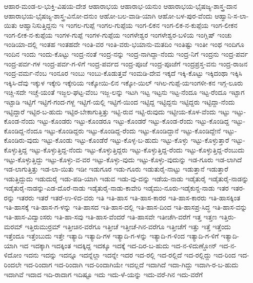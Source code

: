 ಆಹಾರ-ಮಂಡ-ಲ-ಭುಕ್ತಿ-ವಿಷಯ-ದೇಶ
ಆಹಾರಾಭಯ
ಆಹಾರಾಭ-ಯನುಂ
ಆಹಾರಾಭಯ-ಭೈಷಜ್ಯ-ಶಾಸ್ತ್ರ-ದಾನ
ಆಹಾರಾಭಯ-ಭೈಷಜ್ಯ-ಶಾಸ್ತ್ರ-ವಿನೋ-ದನುಂ
ಆಹೋ-ಬಲ-ವಾಡಿ-ಯಾಗಿ
ಆಹೋ-ಬಳ-ಪುರ-ವೆಂದು
ಆಹ್ವಾನಿ-ಸ-ಲಾ-ಯಿತು
ಆಹ್ವಾನಿಸುತ್ತಿದ್ದನು
ಇ
ಇಂಗಲ-ಗುಪ್ಪೆ
ಇಂಗಲ-ಗುಪ್ಪೆಯ
ಇಂಗ-ಲಿಕನ
ಇಂಗ-ಲಿಕ-ನ-ಕುಪ್ಪೆಯ
ಇಂಗ-ಲೀಕನ
ಇಂಗ-ಲೀಕ-ನ-ಕುಪ್ಪೆಯ
ಇಂಗಳ-ಗುಪ್ಪೆ
ಇಂಗಳ-ಗುಪ್ಪೆಯ
ಇಂಗಳೇಶ್ವರ
ಇಂಗಳೇಶ್ವರ-ಬಳಿಯ
ಇಂಗ್ಲಿಷ್
ಇಂಚು
ಇಂಡಿಯಾ-ದಲ್ಲಿ
ಇಂತಹ
ಇಂತಹದೇ
ಇಂತಿ-ವರ
ಇಂತಿ-ವರು-ಭಯಾನು-ಮತದಿಂ
ಇಂತಿಷ್ಟು
ಇಂತೀ
ಇಂಥ
ಇಂದಿಗೂ
ಇಂದಿನ
ಇಂದು
ಇಂದು-ಕೊಟ್ಟು
ಇಂದ್ರ-ನಂತೆ
ಇಂದ್ರ-ನನ್ನು
ಇಂದ್ರ-ನಾಗಿದ್ದಾ-ನೆಂದು
ಇಂದ್ರ-ನಿಗೆ
ಇಂದ್ರನು
ಇಂದ್ರ-ಪರ್ವ
ಇಂದ್ರ-ಪರ್ವ-ಗಳ
ಇಂದ್ರ-ಪರ್ವ-ಗ-ಳಿಗೆ
ಇಂದ್ರ-ಪರ್ವದ
ಇಂದ್ರ-ಪೂಜೆ
ಇಂದ್ರ-ಪೂಜೆಗೆ
ಇಂದ್ರಪ್ರಸ್ತ-ವನು
ಇಂದ್ರ-ರಾಜನ
ಇಂದ್ರ-ವರ್ಮ-ನೆಂಬ
ಇಂನೂರ
ಇಂಬು
ಇಂಬು-ಕೊಡುತ್ತವೆ
ಇಂಮಡಿ-ದೇವ
ಇಕ್ಕದೆ
ಇಕ್ಕಿ-ಕೊಟ್ಟು
ಇಕ್ಕಿದಂಥಾ
ಇಕ್ಕಿಸಿ
ಇಕ್ಕಿಸಿ-ದೆವು
ಇಕ್ಕುಳ
ಇಕ್ಕೇರಿ
ಇಕ್ಕೇರಿಯ
ಇಕ್ಕೋಯಿ-ಲಿನ
ಇಕ್ಕೋ-ಯಿಲ್
ಇಗಿಲ-ಗುಪ್ಪೆ-ಯಇಂಗಳೀ-ಕನ
ಇಗ್ಗ-ಲೂರು
ಇಚ್ಚಿ-ಸದೇ
ಇಚ್ಚೆ-ಯಂತೆ
ಇಜ್ಜಲ-ಘಟ್ಟ-ವೆಂಬ
ಇಜ್ಜ-ಲನ್ನು
ಇಟಗಿ
ಇಟ್ಟ
ಇಟ್ಟನು
ಇಟ್ಟ-ನೆಂದೂ
ಇಟ್ಟ-ರೆಂದೂ
ಇಟ್ಟಾಗ
ಇಟ್ಟಾಡಿ
ಇಟ್ಟಿಗೆ
ಇಟ್ಟಿಗೆ-ಗಂದ-ಗಳ್ದ
ಇಟ್ಟಿಗೆ-ಯಲ್ಲಿ
ಇಟ್ಟಿಗೆ-ಯಿಂದ
ಇಟ್ಟಿದ್ದ
ಇಟ್ಟಿದ್ದನು
ಇಟ್ಟಿದ್ದರು
ಇಟ್ಟಿದ್ದಾ-ನೆಂದು
ಇಟ್ಟಿದ್ದಾರೆ
ಇಟ್ಟಿರ-ಬ-ಹುದು
ಇಟ್ಟಿರ-ಬೇಕಾಗುತ್ತಿತ್ತು
ಇಟ್ಟಿ-ರುವ
ಇಟ್ಟಿ-ರುವುದು
ಇಟ್ಟೀಯ-ಕೊಳ-ವೆಂದು
ಇಟ್ಟು
ಇಟ್ಟು-ಕೊಂಡ-ನೆಂದು
ಇಟ್ಟು-ಕೊಂಡರು
ಇಟ್ಟು-ಕೊಂಡರೂ
ಇಟ್ಟು-ಕೊಂಡರೆ
ಇಟ್ಟು-ಕೊಂಡ-ರೆಂದು
ಇಟ್ಟು-ಕೊಂಡಿದ್ದ
ಇಟ್ಟು-ಕೊಂಡಿದ್ದ-ನೆಂದೂ
ಇಟ್ಟು-ಕೊಂಡಿದ್ದರು
ಇಟ್ಟು-ಕೊಂಡಿದ್ದ-ರೆಂದು
ಇಟ್ಟು-ಕೊಂಡಿದ್ದಾನೆ
ಇಟ್ಟು-ಕೊಂಡಿದ್ದೇನೆ
ಇಟ್ಟು-ಕೊಂಡಿರು-ವುದು
ಇಟ್ಟು-ಕೊಂಡು
ಇಟ್ಟು-ಕೊಂಡೆರೆ
ಇಟ್ಟು-ಕೊಳ್ಳ-ಬ-ಹುದು
ಇಟ್ಟು-ಕೊಳ್ಳು
ಇಟ್ಟು-ಕೊಳ್ಳುತ್ತಾರೆ
ಇಟ್ಟು-ಕೊಳ್ಳುತ್ತಿದ್ದ
ಇಟ್ಟು-ಕೊಳ್ಳುತ್ತಿದ್ದ-ನೆಂದು
ಇಟ್ಟು-ಕೊಳ್ಳುತ್ತಿದ್ದರು
ಇಟ್ಟು-ಕೊಳ್ಳುತ್ತಿದ್ದ-ರೆಂದು
ಇಟ್ಟು-ಕೊಳ್ಳುತ್ತಿದ್ದ-ರೆಂಬುದು
ಇಟ್ಟು-ಕೊಳ್ಳುತ್ತಿದ್ದು
ಇಟ್ಟು-ಕೊಳ್ಳು-ವ-ವರ
ಇಟ್ಟು-ಕೊಳ್ಳು-ವುದು
ಇಟ್ಟು-ಕೊಳ್ಳು-ವುದುನ್ನು
ಇಡ-ಗೂರು
ಇಡ-ಲಾಗಿದೆ
ಇಡ-ಲಾಗುತ್ತಿತ್ತು
ಇಡ-ಲಾ-ಯಿತು
ಇಡೀ
ಇಡುಗೂರ
ಇಡು-ಗೂರು
ಇಡುತುರೈ-ನಾಟ್ಟು
ಇಡುತ್ತಾನೆ
ಇಡುತ್ತಾರೆ
ಇಡುತ್ತಿದ್ದುದು
ಇಡುದುರೈ
ಇಡು-ಪಡಿ-ಯಾಗಿ
ಇಡುವ
ಇಡು-ವು-ದನ್ನು
ಇಡೆಯ-ನಾಡು
ಇಡೈತುರೈ
ಇಡೈತುರೈ-ನಾಡನ್ನು
ಇಡೈತುರೈ-ನಾಡನ್ನು-ಎಡ-ದೊರೆ-ನಾಡು
ಇಡೈತುರೈ-ನಾಡು-ಕಾವೇರಿ
ಇಡೈಮು-ನೂರು-ಇಡೈಕುನ್ದ-ನಾಡು
ಇತರ
ಇತರ-ರನ್ನು
ಇತರರು
ಇತರೆ
ಇತರೆ-ಉ-ಳಿದ-ವರು
ಇತಿ
ಇತಿ-ಹಾಸ
ಇತಿ-ಹಾಸ-ಕಾರರ
ಇತಿ-ಹಾಸ-ಕಾರರು
ಇತಿ-ಹಾಸಕ್ಕಿಂತ
ಇತಿ-ಹಾಸಕ್ಕೆ
ಇತಿ-ಹಾಸ-ಗ-ಳನ್ನು
ಇತಿ-ಹಾಸದ
ಇತಿ-ಹಾಸ-ದಲ್ಲಿ
ಇತಿ-ಹಾಸ-ದಿಂದ
ಇತಿ-ಹಾಸಪ್ರ-ಸಿದ್ಧ
ಇತಿ-ಹಾಸ-ವನ್ನು
ಇತಿ-ಹಾಸ-ವಿದ್ವಾಂಸರು
ಇತಿ-ಹಾ-ಸವು
ಇತಿ-ಹಾಸ-ವೆಂದರೆ
ಇತಿ-ಹಾಸವೇ
ಇತೀಚೆಗಿ-ವರೆಗೆ
ಇತ್ತ
ಇತ್ತಣ
ಇತ್ತಿರು-ಮರಮ್
ಇತ್ತಿರುಮುರ್ರಮ್
ಇತ್ತೀಚಿನ-ವರೆಗೂ
ಇತ್ತೀಚೆ
ಇತ್ತೀಚೆ-ಗಿನ-ವರೆಗೂ
ಇತ್ತೀಚೆಗೆ
ಇತ್ತು
ಇತ್ತೆ
ಇತ್ತೆಂದು
ಇತ್ತೆಂದೂ
ಇತ್ತೆಂಬುದು
ಇತ್ತೇ
ಇತ್ಯಾದಿ
ಇತ್ಯಾದಿ-ಗಳ
ಇತ್ಯಾದಿ-ಗ-ಳನ್ನು
ಇತ್ಯಾದಿ-ಗ-ಳಿಂದ
ಇತ್ಯಾದಿ-ಗ-ಳಿಗೆ
ಇತ್ಯಾದಿ-ಯಾಗಿ
ಇದ
ಇದಕ್ಕಾಗಿ
ಇದಕ್ಕಿಂತ
ಇದಕ್ಕಿದ್ದ
ಇದಕ್ಕೂ
ಇದಕ್ಕೆ
ಇದ-ದಿರ-ಬ-ಹುದು
ಇದ-ನ-ಳಿದುಣ್ಡೋನ್
ಇದ-ನ-ಳಿದೋಂ
ಇದನು
ಇದನ್ನು
ಇದನ್ನೂ
ಇದನ್ನೆಲ್ಲಾ
ಇದನ್ನೇ
ಇದರ
ಇದ-ರಲ್ಲಿ
ಇದ-ರಲ್ಲಿದೆ
ಇದ-ರಲ್ಲಿದ್ದು
ಇದ-ರಿಂದ
ಇದ-ರಿಂದಲೇ
ಇದ-ರಿಂದಾಗ
ಇದ-ರಿಂದಾಗಿ
ಇದ-ರಿಂದಾಗಿಯೇ
ಇದಲ್ಲದೆ
ಇದಾಗಿದೆ
ಇದಾ-ಗಿದ್ದು
ಇದಾಗಿ-ರ-ಬ-ಹುದು
ಇದಾಗಿವೆ
ಇದಾದ
ಇದಿ-ರಾದಾಗ
ಇದಿಷ್ಟೂ
ಇದು
ಇದು-ಳೆ-ಯನ್ನು
ಇದು-ವರೆ-ಗಿನ
ಇದು-ವರೆಗೆ
